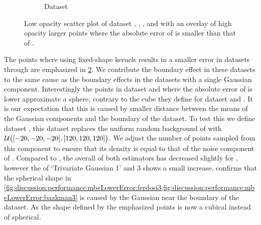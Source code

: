 \begin{figure}
\begin{subfigure}{0.23\textwidth}
				\caption{Dataset \baakmanThree}
				\label{fig:discussion:performance:mbeLowerError:baakman3}
			\end{subfigure}			
			\caption{Low opacity scatter plot of dataset %
				 \ferdosiTwo, %
				 \baakmanTwo, %
				 \ferdosiThree, and %
				 \baakmanThree %
				with an overlay of high opacity larger points where the absolute error of \mbe is smaller than that of \sambe.}
			\label{fig:discussion:performance:multisphere:mbeLowerError}
		\end{figure}	
		The points where using fixed-shape kernels results in a smaller error in datasets \ferdosiTwo through \baakmanThree are emphasized in
		\cref{fig:discussion:performance:multisphere:mbeLowerError}. We contribute the boundary effect in these datasets to the same cause as the boundary effects in the datasets with a single Gaussian component. Interestingly the points in dataset \ferdosiThree and \baakmanThree where the absolute error of \mbe is lower approximate a sphere, contrary to the cube they define for dataset \ferdosiTwo and \baakmanTwo. It is our expectation that this is caused by smaller distance between the means of the Gaussian components and the boundary of the dataset. 
			To test this we define dataset \ferdosiThreeNoise, this dataset replaces the uniform random background of \ferdosiThree with $\mathcal{U}\big([-20, -20, -20], [120, 120, 120]\big)$. We adjust the number of points sampled from this component to ensure that its density is equal to that of the noise component of \ferdosiThree.
			Compared to \ferdosiThree, the overall \mse of both estimators has decreased slightly for \ferdosiThreeNoise, however the \mse of `Trivariate Gaussian 1' and 3 shows a small increase. 
			 confirms that the spherical shape in \cref{fig:discussion:performance:mbeLowerError:ferdosi3,fig:discussion:performance:mbeLowerError:baakman3} is caused by the Gaussian near the boundary of the dataset. As the shape defined by the emphasized points is now a cubical instead of spherical. 
